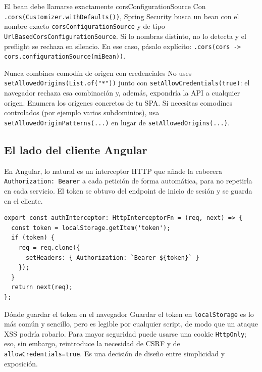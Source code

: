 \documentclass[11pt]{article}
\begin{document}
\begin{cajawarn}{El bean debe llamarse exactamente corsConfigurationSource}
Con \texttt{.cors(Customizer.withDefaults())}, Spring Security busca un bean con el nombre exacto \texttt{corsConfigurationSource} y de tipo \texttt{UrlBasedCorsConfigurationSource}. Si lo nombras distinto, no lo detecta y el preflight se rechaza en silencio. En ese caso, pásalo explícito: \texttt{.cors(cors -> cors.configurationSource(miBean))}.\par
\end{cajawarn}

\begin{cajadanger}{Nunca combines comodín de origen con credenciales}
No uses \texttt{setAllowedOrigins(List.of("*"))} junto con \texttt{setAllowCredentials(true)}: el navegador rechaza esa combinación y, además, expondría la API a cualquier origen. Enumera los orígenes concretos de tu SPA. Si necesitas comodines controlados (por ejemplo varios subdominios), usa \texttt{setAllowedOriginPatterns(...)} en lugar de \texttt{setAllowedOrigins(...)}.\par
\end{cajadanger}

\subsection{El lado del cliente Angular}
En Angular, lo natural es un interceptor HTTP que añade la cabecera \texttt{Authorization:\allowbreak{} Bearer} a cada petición de forma automática, para no repetirla en cada servicio. El token se obtuvo del endpoint de inicio de sesión y se guarda en el cliente.

\begin{cajacodigo}
\begin{lstlisting}[style=markup]
export const authInterceptor: HttpInterceptorFn = (req, next) => {
  const token = localStorage.getItem('token');
  if (token) {
    req = req.clone({
      setHeaders: { Authorization: `Bearer ${token}` }
    });
  }
  return next(req);
};
\end{lstlisting}
\end{cajacodigo}

\begin{cajawarn}{Dónde guardar el token en el navegador}
Guardar el token en \texttt{localStorage} es lo más común y sencillo, pero es legible por cualquier script, de modo que un ataque XSS podría robarlo. Para mayor seguridad puede usarse una cookie \texttt{HttpOnly}; eso, sin embargo, reintroduce la necesidad de CSRF y de \texttt{allowCredentials=true}. Es una decisión de diseño entre simplicidad y exposición.\par
\end{cajawarn}
\end{document}

